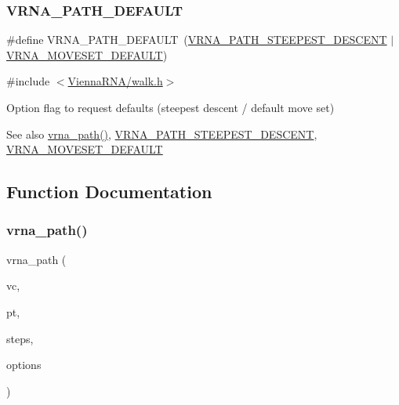 \subsubsection{\texorpdfstring{V\+R\+N\+A\+\_\+\+P\+A\+T\+H\+\_\+\+D\+E\+F\+A\+U\+LT}{VRNA\_PATH\_DEFAULT}}
{\footnotesize\ttfamily \#define V\+R\+N\+A\+\_\+\+P\+A\+T\+H\+\_\+\+D\+E\+F\+A\+U\+LT~(\mbox{\hyperlink{group__paths_ga705cea2b3243a38a2d6e3b1e141ed061}{V\+R\+N\+A\+\_\+\+P\+A\+T\+H\+\_\+\+S\+T\+E\+E\+P\+E\+S\+T\+\_\+\+D\+E\+S\+C\+E\+NT}} $\vert$ \mbox{\hyperlink{group__neighbors_gaa5ffec4dd0d02df320f123e6888154d1}{V\+R\+N\+A\+\_\+\+M\+O\+V\+E\+S\+E\+T\+\_\+\+D\+E\+F\+A\+U\+LT}})}



{\ttfamily \#include $<$\mbox{\hyperlink{walk_8h}{Vienna\+R\+N\+A/walk.\+h}}$>$}



Option flag to request defaults (steepest descent / default move set) 

\begin{DoxySeeAlso}{See also}
\mbox{\hyperlink{group__paths_gab6aee4143f8b103518d5cbfe6bfe5eae}{vrna\+\_\+path()}}, \mbox{\hyperlink{group__paths_ga705cea2b3243a38a2d6e3b1e141ed061}{V\+R\+N\+A\+\_\+\+P\+A\+T\+H\+\_\+\+S\+T\+E\+E\+P\+E\+S\+T\+\_\+\+D\+E\+S\+C\+E\+NT}}, \mbox{\hyperlink{group__neighbors_gaa5ffec4dd0d02df320f123e6888154d1}{V\+R\+N\+A\+\_\+\+M\+O\+V\+E\+S\+E\+T\+\_\+\+D\+E\+F\+A\+U\+LT}} 
\end{DoxySeeAlso}


\subsection{Function Documentation}
\mbox{\label{group__paths_gab6aee4143f8b103518d5cbfe6bfe5eae}} 
\subsubsection{\texorpdfstring{vrna\+\_\+path()}{vrna\_path()}}
{\footnotesize\ttfamily vrna\+\_\+path (\begin{DoxyParamCaption}\item[{\mbox{\hyperlink{group__fold__compound_ga1b0cef17fd40466cef5968eaeeff6166}{vrna\+\_\+fold\+\_\+compound\+\_\+t}} $\ast$}]{vc,  }\item[{short $\ast$}]{pt,  }\item[{unsigned int}]{steps,  }\item[{unsigned int}]{options }\end{DoxyParamCaption})}



